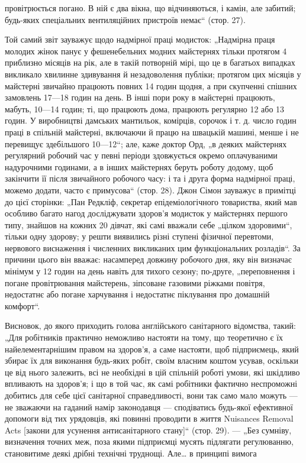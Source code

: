 \parcont{}  %
провітрюється погано. В ній є два вікна, що відчиняються, і камін,
але забитий; будь-яких спеціальних вентиляційних пристроїв немає“ (стор. 27).

Той самий звіт зауважує щодо надмірної праці модисток:
„Надмірна праця молодих жінок панує у фешенебельних модних майстернях тільки протягом 4 приблизно
місяців на рік,
але в такій потворній мірі, що це в багатьох випадках викликало хвилинне здивування й незадоволення
публіки; протягом
цих місяців у майстерні звичайно працюють повних 14 годин
щодня, а при скупченні спішних замовлень 17—18 годин на день.
В інші пори року в майстерні працюють, мабуть, 10—14 годин;
ті, що працюють дома, працюють регулярно 12 або 13 годин.
У виробництві дамських мантильок, комірців, сорочок і т. д.
число годин праці в спільній майстерні, включаючи й працю на
швацькій машині, менше і не перевищує здебільшого 10—12“;
але, каже доктор Орд, „в деяких майстернях регулярний робочий час у певні періоди здовжується окремо
оплачуваними надурочними годинами, а в інших майстернях беруть роботу додому, щоб закінчити її після
звичайного робочого часу: і та
і друга форма надмірної праці, можемо додати, часто є примусова“ (стор. 28). Джон Сімон зауважує в
примітці до цієї сторінки: „Пан Редкліф, секретар епідеміологічного товариства,
який мав особливо багато нагод досліджувати здоров’я модисток
у майстернях першого типу, знайшов на кожних 20 дівчат, які
самі вважали себе „цілком здоровими“, тільки одну здорову;
у решти виявились різні ступені фізичної перевтоми, нервового
виснаження і численних викликаних цим функціональних розладів“.
За причини цього він вважає: насамперед довжину робочого
дня, яку він визначає мінімум у 12 годин на день навіть для
тихого сезону; по-друге, „переповнення і погане провітрювання
майстерень, зіпсоване газовими ріжками повітря, недостатнє
або погане харчування і недостатнє піклування про домашній
комфорт“.

Висновок, до якого приходить голова англійського санітарного відомства, такий: „Для робітників
практично неможливо
настояти на тому, що теоретично є їх найелементарнішим правом
на здоров’я, а саме настояти, щоб підприємець, який збирає
їх для виконання будь-яких робіт, своїм власним коштом усував,
оскільки це від нього залежить, всі не необхідні в цій спільній
роботі умови, які шкідливо впливають на здоров’я; і що в той
час, як самі робітники фактично неспроможні добитись для себе
цієї санітарної справедливості, вони так само мало можуть —
не зважаючи на гаданий намір законодавця — сподіватись будь-якої ефективної допомоги від тих
урядовців, які повинні проводити в життя Nuisances Removal Acts [закони для усунення антисанітарного
стану]“ (стор. 29). — „Без сумніву, визначення точних меж, поза якими підприємці мусять підлягати
регулюванню, становитиме деякі дрібні технічні труднощі. Але\dots{} в принципі вимога
\parbreak{}  %
